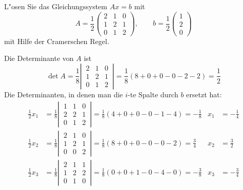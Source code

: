 L"osen Sie das Gleichungssystem $Ax=b$ mit
\[
A=\frac12\begin{pmatrix}2&1&0\\1&2&1\\0&1&2\end{pmatrix},\qquad
b=\frac12\begin{pmatrix}1\\2\\0\end{pmatrix}
\]
mit Hilfe der Cramerschen Regel.

\begin{loesung}
Die Determinante von $A$ ist
\[
\operatorname{det}A
=
\frac18
\left|\,\begin{matrix}2&1&0\\1&2&1\\0&1&2\end{matrix}\,\right|
=\frac18(8+0+0-0-2-2)=\frac12
\]
Die Determinanten, in denen man die $i$-te Spalte durch $b$ ersetzt hat:
\begin{align*}
\frac12 x_1&=
\frac18\left|\,\begin{matrix}
1&1&0\\
2&2&1\\
0&1&2\end{matrix}\,\right|
=\frac18(4+0+0-0-1-4)=-\frac18
&x_1&=-\frac14
\\
\frac12 x_2&=
\frac18\left|\,\begin{matrix}
2&1&0\\
1&2&1\\
0&0&2\end{matrix}\,\right|
=\frac18(8+0+0-0-0-2)=\frac34
&x_2&=\frac32
\\
\frac12 x_3&=
\frac18\left|\,\begin{matrix}
2&1&1\\
1&2&2\\
0&1&0\end{matrix}\,\right|
=\frac18(0+0+1-0-4-0)=-\frac38
&x_3&=-\frac34
\end{align*}
\end{loesung}


